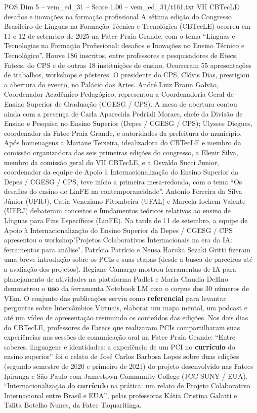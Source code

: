 \begin{textsample}{POS Dim 5 – vem\_ed\_31 – Score 1.00 – vem\_ed\_31/t161.txt}  \label{ex:f5_pos_050}
VII CBTecLE: desafios e inovações na formação profissional A sétima edição do Congresso Brasileiro de Línguas na Formação Técnica e Tecnológica (CBTecLE) ocorreu em 11 e 12 de setembro de 2025 na Fatec Praia Grande, com o tema “Línguas e Tecnologias na Formação Profissional: desafios e Inovações no Ensino Técnico e Tecnológico”.
Houve 186 inscritos, entre professores e pesquisadores de Etecs, Fatecs, do CPS e de outras 18 instituições de ensino.
Ocorreram 55 apresentações de trabalhos, workshops e pôsteres.
O presidente do CPS, Clóvis Dias, prestigiou a abertura do evento, no Palácio das Artes.
André Luiz Braun Galvão, Coordenador Acadêmico-Pedagógico, representou a Coordenadoria Geral de Ensino Superior de Graduação (CGESG / CPS).
A mesa de abertura contou ainda com a presença de Carla Aparecida Pedriali Moraes, chefe da Divisão de Ensino e Pesquisa no Ensino Superior (Depes / CGESG / CPS); Ulysses Diegues, coordenador da Fatec Praia Grande, e autoridades da prefeitura do município.
Após homenagens a Mariane Teixeira, idealizadora do CBTecLE e membro da comissão organizadora das seis primeiras edições do congresso, a Elenir Silva, membro da comissão geral do VII CBTecLE, e a Osvaldo Succi Junior, coordenador da equipe de Apoio à Internacionalização do Ensino Superior da Depes / CGESG / CPS, teve início a primeira mesa-redonda, com o tema “Os desafios do ensino de LinFE na contemporaneidade”.
Antonio Ferreira da Silva Júnior (UFRJ), Catia Veneziano Pitombeira (UFAL) e Marcela Iochem Valente (UERJ) debateram conceitos e fundamentos teóricos relativos ao ensino de Línguas para Fins Específicos (LinFE).
Na tarde de 11 de setembro, a equipe de Apoio à Internacionalização do Ensino Superior da Depes / CGESG / CPS apresentou o workshop"Projetos Colaborativos Internacionais na era da IA: ferramentas para análise".
Patrícia Patrício e Neusa Haruka Sezaki Gritti fizeram uma breve introdução sobre os PCIs e suas etapas (desde a busca de parceiros até a avaliação dos projetos).
Regiane Camargo mostrou ferramentas de IA para planejamento de atividades na plataforma Padlet e Maria Claudia Delfino demonstrou o \textbf{uso} da ferramenta Notebook LM com o corpus dos 30 números de VEm.
O conjunto das publicações serviu como \textbf{referencial} para levantar perguntas sobre Intercâmbios Virtuais, elaborar um mapa mental, um podcast e até um vídeo de apresentação resumindo os conteúdos das edições.
Nos dois dias do CBTecLE, professores de Fatecs que realizaram PCIs compartilharam suas experiências nas sessões de comunicação oral na Fatec Praia Grande: “Entre saberes, linguagens e identidades: a experiência de um PCI no \textbf{currículo} do ensino superior” foi o relato de José Carlos Barbosa Lopes sobre duas edições (segundo semestre de 2020 e primeiro de 2021) do projeto desenvolvido nas Fatecs Ipiranga e São Paulo com Jamestown Community College (JCC SUNY / EUA). “Internacionalização do \textbf{currículo} na prática: um relato de Projeto Colaborativo Internacional entre Brasil e EUA”, pelas professoras Kátia Cristina Galatti e Talita Botelho Nunes, da Fatec Taquaritinga.

\end{textsample}
